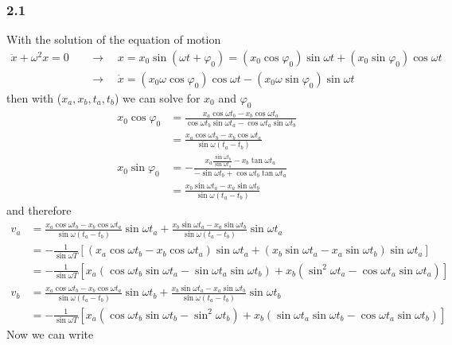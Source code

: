 \documentclass[10pt,a4paper]{article}
\theoremstyle{definition}
\begin{document}
\subsubsection{2.1}
With the solution of the equation of motion 
\begin{align}
    \ddot x+\omega^2x=0 &\quad\rightarrow\quad x=x_0\sin(\omega t+\varphi_0)=(x_0\cos\varphi_0)\sin \omega t+(x_0\sin\varphi_0)\cos\omega t\\
    &\quad\rightarrow\quad \dot x=(x_0\omega\cos\varphi_0)\cos \omega t-(x_0\omega\sin\varphi_0)\sin\omega t
\end{align}
then with ($x_a,x_b,t_a,t_b$) we can solve for $x_0$ and $\varphi_0$
\begin{align}
    x_0\cos\varphi_0
    &=\frac{x_a\cos\omega t_b-x_b\cos\omega t_a}{\cos\omega t_b\sin\omega t_a-\cos\omega t_a\sin\omega t_b}\\
    &=\frac{x_a\cos\omega t_b-x_b\cos\omega t_a}{\sin\omega(t_a-t_b)}\\
    x_0\sin\varphi_0&=-\frac{x_a\frac{\sin\omega t_b}{\sin\omega t_a}-x_b\tan\omega t_a}{-\sin\omega t_b+\cos\omega t_b\tan\omega t_a}\\
    &=\frac{x_b\sin\omega t_a-x_a\sin\omega t_b}{\sin\omega(t_a-t_b)}
\end{align}
and therefore
\begin{align}
    v_a&=\frac{x_a\cos\omega t_b-x_b\cos\omega t_a}{\sin\omega(t_a-t_b)}\sin\omega t_a+\frac{x_b\sin\omega t_a-x_a\sin\omega t_b}{\sin\omega(t_a-t_b)}\sin\omega t_a\\
    &=-\frac{1}{\sin\omega T}\left[(x_a\cos\omega t_b-x_b\cos\omega t_a)\sin\omega t_a+(x_b\sin\omega t_a-x_a\sin\omega t_b)\sin\omega t_a\right]\\
    &=-\frac{1}{\sin\omega T}\left[x_a(\cos\omega t_b\sin\omega t_a-\sin\omega t_a\sin\omega t_b)+x_b(\sin^2\omega t_a-\cos\omega t_a\sin\omega t_a)\right]\\
    v_b&=\frac{x_a\cos\omega t_b-x_b\cos\omega t_a}{\sin\omega(t_a-t_b)}\sin\omega t_b+\frac{x_b\sin\omega t_a-x_a\sin\omega t_b}{\sin\omega(t_a-t_b)}\sin\omega t_b\\
    &=-\frac{1}{\sin\omega T}\left[x_a(\cos\omega t_b\sin\omega t_b-\sin^2\omega t_b)+x_b(\sin\omega t_a\sin\omega t_b-\cos\omega t_a\sin\omega t_b)\right]
\end{align}
Now we can write
\end{document}
